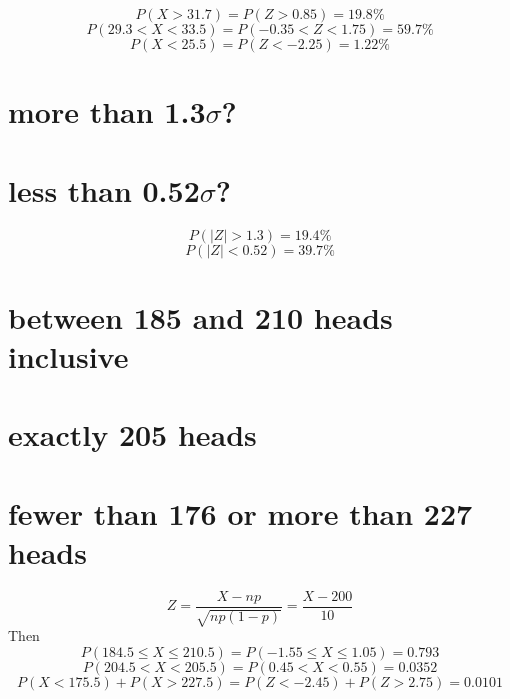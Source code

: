 \documentclass[answers]{exam}
\begin{document}
\begin{questions}
\begin{solution}
	$$P(X>31.7) = P(Z>0.85) = 19.8\%$$
	$$P(29.3<X<33.5) = P(-0.35<Z<1.75) = 59.7\%$$
	$$P(X<25.5) = P(Z<-2.25) = 1.22\%$$
\end{solution}


\begin{parts}
	\part{more than 1.3$\sigma$?}
	\part{less than 0.52$\sigma$?}
\end{parts}

\begin{solution}
	$$P(|Z|>1.3) = 19.4\%$$
	$$P(|Z|<0.52) = 39.7\%$$
\end{solution}


\begin{parts}
	\part{between 185 and 210 heads inclusive}
	\part{exactly 205 heads}
	\part{fewer than 176 or more than 227 heads}
\end{parts}

\begin{solution}
	$$Z = \frac{X-np}{\sqrt{np(1-p)}} = \frac{X-200}{10}$$
	Then
	$$P(184.5\leq X\leq210.5) = P(-1.55\leq X\leq 1.05) = 0.793$$
	$$P(204.5<X<205.5) = P(0.45<X<0.55) = 0.0352$$
	$$P(X<175.5) + P(X>227.5) = P(Z<-2.45) + P(Z>2.75) = 0.0101$$
\end{solution}


\begin{parts}

\end{parts}
\end{questions}
\end{document}
